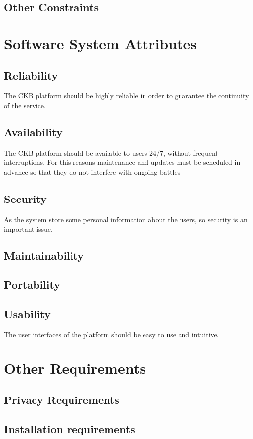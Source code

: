 \subsection{Other Constraints}

\section{Software System Attributes}
\subsection{Reliability}
The CKB platform should be highly reliable in order to guarantee the continuity of the service. 
\subsection{Availability}
The CKB platform should be available to users 24/7, without frequent interruptions. For this reasons maintenance and updates must be scheduled in advance so that they do not interfere with ongoing battles.
\subsection{Security}
As the system store some personal information about the users, so security is an important issue.
\subsection{Maintainability}
\subsection{Portability}
\subsection{Usability}
The user interfaces of the platform should be easy to use and intuitive.

\section{Other Requirements}
\subsection{Privacy Requirements}
\subsection{Installation requirements}
